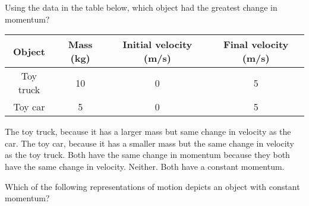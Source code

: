 \documentclass[answers]{exam}
\begin{document}
\begin{questions}

\question 
Using the data in the table below, which object had the greatest change in momentum?

\begin{center}
    \begin{tabular}{|c|c|c|c|}
        \hline
        Object & Mass (kg) & Initial velocity (m/s) & Final velocity (m/s)\\ \hline
        Toy truck & 10 & 0 & 5\\ \hline
        Toy car & 5 & 0 & 5\\ \hline
    \end{tabular}
\end{center}

\begin{randomizechoices}[norandomize]
    \correctchoice The toy truck, because it has a larger mass but same change in velocity as the car.
    \choice The toy car, because it has a smaller mass but the same change in velocity as the toy truck.
    \choice Both have the same change in momentum because they both have the same change in velocity.
    \choice Neither. Both have a constant momentum.
\end{randomizechoices}

\question 
Which of the following representations of motion depicts an object with constant momentum?


\end{questions}
\end{document}
